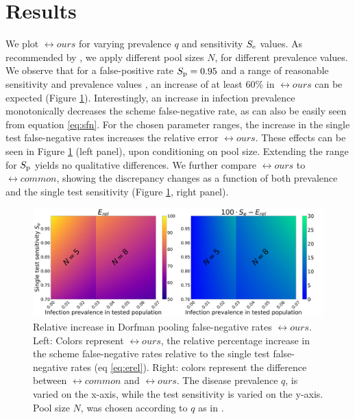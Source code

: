 \documentclass{article}
\begin{document}
\section{Results}\label{section:results}
We plot $\rel{ours}$ for varying prevalence $q$ and sensitivity $S_\text{e}$
values. As recommended by \cite{DorfmanYuvalDor}, we apply different
pool sizes $N$, for different prevalence values. We observe that for a
false-positive rate $S_\text{p}=0.95$ \cite{DorfmanYuvalDor} and a range of
reasonable sensitivity and prevalence values \cite{KitComparison,
  InterpretingCOVID19Test, EstimatingRatesLourenco,
  FalsePositiveEstimate}, an increase of at least $60\%$ in
$\rel{ours}$ can be expected (Figure \ref{figy}). Interestingly, an
increase in infection prevalence monotonically decreases the scheme
false-negative rate, as can also be easily seen from equation
\eqref{eq:sfn}. For the chosen parameter ranges, the increase in the
single test false-negative rates increases the relative error
$\rel{ours}$. These effects can be seen in Figure \ref{figy} (left panel),
upon conditioning on pool size. Extending the range for $S_\text{p}$ yields
no qualitative differences. We further compare $\rel{ours}$ to
$\rel{common}$, showing the discrepancy changes as a function of both
prevalence and the single test sensitivity (Figure \ref{figy}, right
panel).
\begin{figure}[H]
    \centering
    \includegraphics[width=18cm]{heatmap.jpg}
    \caption{Relative increase in Dorfman pooling false-negative rates
      $\rel{ours}$. Left: Colors represent $\rel{ours}$, the relative
      percentage increase in the scheme false-negative rates relative
      to the single test false-negative rates (eq
      \eqref{eq:erel}). Right: colors represent the difference between
      $\rel{common}$ and $\rel{ours}$. The disease prevalence $q$, is
      varied on the x-axis, while the test sensitivity is varied on
      the y-axis. Pool size $N$, was chosen according to $q$ as in
      \cite{DorfmanYuvalDor}.}\label{figy}
 \end{figure}
\end{document}

